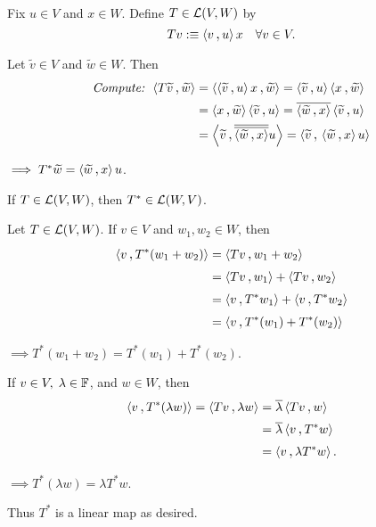 \begin{example}
  \phantom{.} \\
  Fix $u \in V$ and $x \in W$. Define $T \in \mathcal{L}(V,W)$ by
  \[
    Tv :\equiv \ip{v}{u} x \quad \forall v \in V.
  \]

 Let $\widetilde v \in V$ and $\widetilde w \in W$. Then
 \begin{equation}
   \begin{aligned}
     \text{\emph{Compute: }}
     \ip{T \widetilde v}{\widetilde w}
     & = \ip{\ip{\widetilde v}{u}x}{\widetilde w} = \ip{\widetilde v}{u}\ip{x}{\widetilde w} \\
     & = \ip{x}{\widetilde w}\ip{\widetilde v}{u} = \overline{\ip{\widetilde w}{x}}\ip{\widetilde v}{u} \\
     & = \ip{\widetilde v}{\overline{\overline{\ip{\widetilde w}{x}}} u} = \ip{\widetilde v}{\ip{\widetilde w}{x}u}
   \end{aligned}
 \end{equation}

 $\implies T^{*} \widetilde w = \ip{\widetilde w}{x}u$.
\end{example}

\begin{thm}
  If $T \in \mathcal{L} (V,W)$, then $T^{*} \in \mathcal{L}(W,V)$.
\end{thm}
\begin{prf}
  Let $T \in \mathcal{L}(V,W)$. If $v \in V$ and $w_1, w_2 \in W$, then
  \[
    \begin{aligned}
      \ip{v}{T^{*}(w_1 + w_2)}
      &= \ip{Tv}{w_1 + w_2} \\
      &= \ip{Tv}{w_1} + \ip{Tv}{w_2}\\
      &= \ip{v}{T^*w_1}+\ip{v}{T^*w_2}\\
      &= \ip{v}{T^*(w_1) + T^*(w_2)}
    \end{aligned}
  \]

  $\implies T^*(w_1 + w_2) = T^*(w_1) + T^*(w_2)$.

  If $v \in V, \; \lambda \in \mathbb{F}$, and $w\in W$, then
  \[
    \begin{aligned}
      \ip{v}{T^*(\lambda w)} = \ip{Tv}{\lambda w}
      & = \overline  \lambda  \ip{Tv}{w}\\
      & = \overline \lambda \ip{v}{T^* w}\\
      & = \ip{v}{\lambda T^* w}.
    \end{aligned}
  \]

  $\implies T^* (\lambda w) = \lambda T^* w.$

  Thus $T^*$ is a linear map as desired.
\end{prf}

